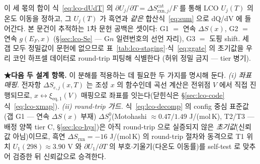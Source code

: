 \documentclass[11pt,a4paper]{article}
\newcommand{\eq}{\mathrm{eq}}
\newcommand{\rxn}{\mathrm{rxn}}
\begin{document}
이 세 몫의 합이 식~\eqref{eq:lco-dUdT} 의 $\partial U_j/\partial T=\Delta S_{\rxn,j}^\mathrm{cat}/F$ 를 통해 LCO
$U_j(T)$ 의 온도 이동을 정하고, 그 $U_j(T)$ 가 흑연과 \emph{같은} 합산식~\eqref{eq:sum} 으로 dQ/dV 에 들어간다.
본 문건이 추적하는 1차 문헌 공백은 셋이다: G1 $=$ 연속 $\Delta S(x)$, G2 $=$ 연속 $g(E_F,x)$
(\S\ref{sec:lco-Se} — G$n$ 일련번호의 선언 자리), G3 $=$ 도핑 shift. 세 갭 모두 정밀값이 문헌에 없으므로
표~\ref{tab:lco-staging}$\cdot$식~\eqref{eq:ggate} 의 초기값을 우리 코인 하프셀 데이터로 round-trip 피팅해 식별한다
(허위 정밀 금지 — tier 병기).

\textbf{★다음 두 설계 항목.} 이 분해를 적용하는 데 필요한 두 가지를 명시해 둔다.
\emph{(i) 좌표 매핑.} 전자항 $\Delta S_{e,j}(x,T)$ 는 조성 $x$ 의 함수인데 곡선 계산은 전위점 $V$ 에서 직접 진행되므로,
$x\!\leftrightarrow\!\xi_{\eq,1}(V)$ 매핑으로 좌표를 잇는다(닫힌식은 \S\ref{sec:lco-code} 식~\eqref{eq:lco-xmap}). \emph{(ii) round-trip 가드.} 식~\eqref{eq:lco-decomp} 의 config 중심 표준값(갭 G1 --- 연속 $\Delta S(x)$ 부재)
$\Delta S_j^0$(Motohashi\cite{motohashi2009} $\approx0.47/1.49$ J/(mol\,K), T2/T3 — 배정 양쪽 tier C,
\S\ref{sec:lco-hys})은 아직 round-trip 으로 실증되지 않은
\emph{초기값}(신뢰값 아님)이므로, 흑연 $\Delta S_\rxn{=}-16$ J/(mol\,K) 의 round-trip 절차와 동격으로 T1 위치
$U_1(298)\approx3.90$ V 와 $\partial U_1/\partial T$ 의 부호$\cdot$기울기(다온도 이동률)를 self-test 로 맞추어
검증한 뒤 신뢰값으로 승격한다.
\end{document}
